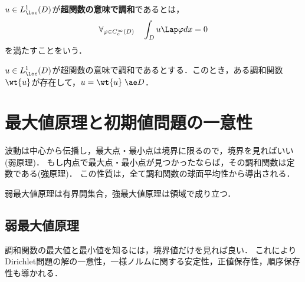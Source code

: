 \documentclass[uplatex,dvipdfmx]{jsreport}
\begin{document}
\begin{definition}
    $u\in L^1_\loc(D)$が\textbf{超関数の意味で調和}であるとは，
    \[\forall_{\varphi\in C_c^\infty(D)}\quad\int_Du\Lap\varphi dx=0\]
    を満たすことをいう．
\end{definition}

\begin{theorem}[Weylの補題]
    $u\in L^1_\loc(D)$が超関数の意味で調和であるとする．このとき，ある調和関数$\wt{u}$が存在して，$u=\wt{u}\;\ae D$．
\end{theorem}

\section{最大値原理と初期値問題の一意性}

\begin{tcolorbox}[colframe=ForestGreen, colback=ForestGreen!10!white,breakable,colbacktitle=ForestGreen!40!white,coltitle=black,fonttitle=\bfseries\sffamily,
title=]
    波動は中心から伝播し，最大点・最小点は境界に限るので，境界を見ればいい(弱原理)．
    もし内点で最大点・最小点が見つかったならば，その調和関数は定数である(強原理)．
    この性質は，全て調和関数の球面平均性から導出される．
\end{tcolorbox}

\begin{remark}
    弱最大値原理は有界開集合，強最大値原理は領域で成り立つ．
\end{remark}

\subsection{弱最大値原理}

\begin{tcolorbox}[colframe=ForestGreen, colback=ForestGreen!10!white,breakable,colbacktitle=ForestGreen!40!white,coltitle=black,fonttitle=\bfseries\sffamily,
title=]
    調和関数の最大値と最小値を知るには，境界値だけを見れば良い．
    これによりDirichlet問題の解の一意性，一様ノルムに関する安定性，正値保存性，順序保存性も導かれる．
\end{tcolorbox}
\end{document}
